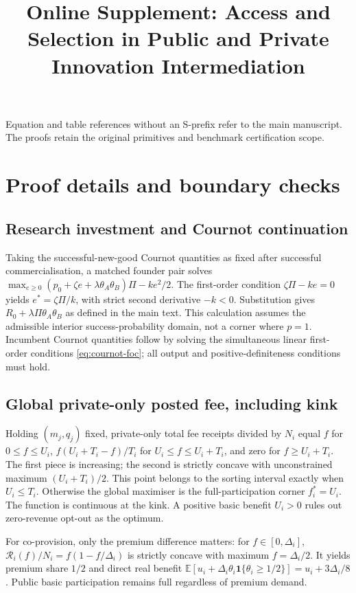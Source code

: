\documentclass[11pt]{article}
\title{Online Supplement: Access and Selection in Public and Private Innovation Intermediation}
\author{}
\date{}
\begin{document}
\maketitle
\noindent Equation and table references without an S-prefix refer to the main manuscript.
The proofs retain the original primitives and benchmark certification scope.
\section{Proof details and boundary checks}\label{app:proofs}

\subsection{Research investment and Cournot continuation}
Taking the successful-new-good Cournot quantities as fixed after successful commercialisation, a matched founder pair solves
$\max_{e\geq0}(p_0+\zeta e+\lambda\theta_A\theta_B)\Pi-ke^2/2$.
The first-order condition $\zeta\Pi-ke=0$ yields $e^*=\zeta\Pi/k$, with strict second derivative $-k<0$. Substitution gives $R_0+\lambda\Pi\theta_A\theta_B$ as defined in the main text. This calculation assumes the admissible interior success-probability domain, not a corner where $p=1$. Incumbent Cournot quantities follow by solving the simultaneous linear first-order conditions \eqref{eq:cournot-foc}; all output and positive-definiteness conditions must hold.

\subsection{Global private-only posted fee, including kink}
Holding $(m_j,q_j)$ fixed, private-only total fee receipts divided by $N_i$ equal $f$ for $0\leq f\leq U_i$, $f(U_i+T_i-f)/T_i$ for $U_i\leq f\leq U_i+T_i$, and zero for $f\geq U_i+T_i$. The first piece is increasing; the second is strictly concave with unconstrained maximum $(U_i+T_i)/2$. This point belongs to the sorting interval exactly when $U_i\leq T_i$. Otherwise the global maximiser is the full-participation corner $f_i^*=U_i$. The function is continuous at the kink. A positive basic benefit $U_i>0$ rules out zero-revenue opt-out as the optimum.

For co-provision, only the premium difference matters: for $f\in[0,\Delta_i]$,
$\mathcal R_i(f)/N_i=f(1-f/\Delta_i)$ is strictly concave with maximum $f=\Delta_i/2$. It yields premium share $1/2$ and direct real benefit $\mathbb E[u_i+\Delta_i\theta_i\mathbf1\{\theta_i\geq1/2\}]=u_i+3\Delta_i/8$. Public basic participation remains full regardless of premium demand.
\end{document}
